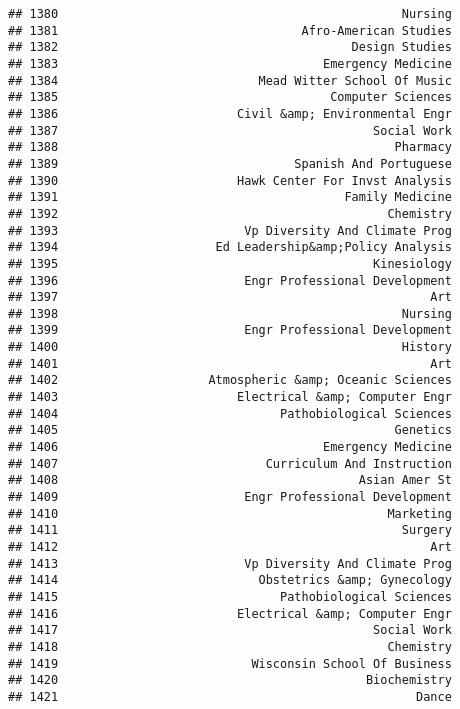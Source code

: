 \documentclass[
]{article}
\begin{document}
\begin{verbatim}
## 1380                                                Nursing
## 1381                                  Afro-American Studies
## 1382                                         Design Studies
## 1383                                     Emergency Medicine
## 1384                            Mead Witter School Of Music
## 1385                                      Computer Sciences
## 1386                         Civil &amp; Environmental Engr
## 1387                                            Social Work
## 1388                                               Pharmacy
## 1389                                 Spanish And Portuguese
## 1390                         Hawk Center For Invst Analysis
## 1391                                        Family Medicine
## 1392                                              Chemistry
## 1393                          Vp Diversity And Climate Prog
## 1394                      Ed Leadership&amp;Policy Analysis
## 1395                                            Kinesiology
## 1396                          Engr Professional Development
## 1397                                                    Art
## 1398                                                Nursing
## 1399                          Engr Professional Development
## 1400                                                History
## 1401                                                    Art
## 1402                     Atmospheric &amp; Oceanic Sciences
## 1403                         Electrical &amp; Computer Engr
## 1404                               Pathobiological Sciences
## 1405                                               Genetics
## 1406                                     Emergency Medicine
## 1407                             Curriculum And Instruction
## 1408                                          Asian Amer St
## 1409                          Engr Professional Development
## 1410                                              Marketing
## 1411                                                Surgery
## 1412                                                    Art
## 1413                          Vp Diversity And Climate Prog
## 1414                            Obstetrics &amp; Gynecology
## 1415                               Pathobiological Sciences
## 1416                         Electrical &amp; Computer Engr
## 1417                                            Social Work
## 1418                                              Chemistry
## 1419                           Wisconsin School Of Business
## 1420                                           Biochemistry
## 1421                                                  Dance

\end{verbatim}
\end{document}

